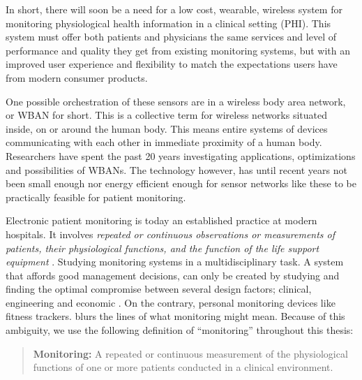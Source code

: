 
In short, there will soon be a need for a low cost, wearable, wireless system for monitoring physiological health information in a clinical setting (PHI). This system must offer both patients and physicians the same services and level of performance and quality they get from existing monitoring systems, but with an improved user experience and flexibility to match the expectations users have from modern consumer products. 

One possible orchestration of these sensors are in a wireless body area network, or WBAN for short. This is a collective term for wireless networks situated inside, on or around the human body. This means entire systems of devices communicating with each other in immediate proximity of a human body. Researchers have spent the past 20 years investigating applications, optimizations and possibilities of WBANs. The technology however, has until recent years not been small enough nor energy efficient enough for sensor networks like these to be practically feasible for patient monitoring.

Electronic patient monitoring is today an established practice at modern hospitals. It involves \textit{repeated or continuous observations or measurements of patients, their physiological functions, and the function of the life support equipment} \cite{PMID:10315668}. Studying monitoring systems in a multidisciplinary task. A system that affords good management decisions, can only be created by studying and finding the optimal compromise between several design factors; clinical, engineering and economic \cite{Anonymous:yOjY0N0Y}. On the contrary, personal monitoring devices like fitness trackers. blurs the lines of what monitoring might mean. Because of this ambiguity, we use the following definition of ``monitoring'' throughout this thesis: 

\begin{quote}
\textbf{Monitoring:} A repeated or continuous measurement of the physiological functions of one or more patients conducted in a clinical environment.
\end{quote}

